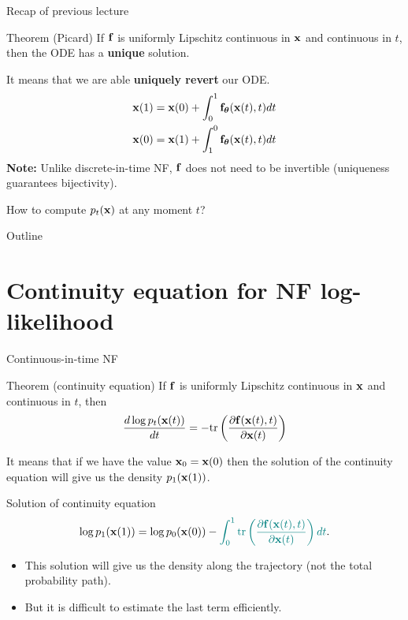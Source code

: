 \begin{frame}{Recap of previous lecture}
	\begin{block}{Theorem (Picard)}
		If $\mathbf{f}$ is uniformly Lipschitz continuous in $\mathbf{x}$ and continuous in $t$, then the ODE has a \textbf{unique} solution.
	\end{block}
	It means that we are able \textbf{uniquely revert} our ODE. 
	\begin{align*}
		\mathbf{x}(1) &= \mathbf{x}(0) + \int_{0}^{1} \mathbf{f}_{\boldsymbol{\theta}}(\mathbf{x}(t), t) dt \\
		\mathbf{x}(0) &= \mathbf{x}(1) + \int_{1}^{0} \mathbf{f}_{\boldsymbol{\theta}}(\mathbf{x}(t), t) dt
	\end{align*}
	\textbf{Note:} Unlike discrete-in-time NF, $\mathbf{f}$ does not need to be invertible (uniqueness guarantees bijectivity).
	
	How to compute $p_t(\mathbf{x})$ at any moment $t$?
\end{frame}
\begin{frame}{Outline}
	\tableofcontents
\end{frame}
\section{Continuity equation for NF log-likelihood}
\begin{frame}{Continuous-in-time NF}
	\begin{block}{Theorem (continuity equation)}
		If $\mathbf{f}$ is uniformly Lipschitz continuous in $\mathbf{x}$ and continuous in $t$, then
		\[
			\frac{d \log p_t(\mathbf{x}(t))}{d t} = - \text{tr} \left( \frac{\partial \mathbf{f}(\mathbf{x}(t), t)}{\partial \mathbf{x}(t)} \right)
		\]
		\vspace{-0.3cm}
	\end{block}
	It means that if we have the value $\mathbf{x}_0 = \mathbf{x}(0)$ then the solution of the continuity equation will give us the density $p_1(\mathbf{x}(1))$.
	\begin{block}{Solution of continuity equation}
		\vspace{-0.3cm}
		\[
			\log p_1(\mathbf{x}(1)) = \log p_0(\mathbf{x}(0)) - {\color{teal}\int_{0}^{1} \text{tr}  \left( \frac{\partial \mathbf{f}(\mathbf{x}(t), t)}{\partial \mathbf{x}(t)} \right) dt}.
		\]
	\end{block}
	\begin{itemize}
		\item This solution will give us the density along the trajectory (not the total probability path).
		\item But it is difficult to estimate {\color{teal}the last term} efficiently.
	 \end{itemize}
\end{frame}
